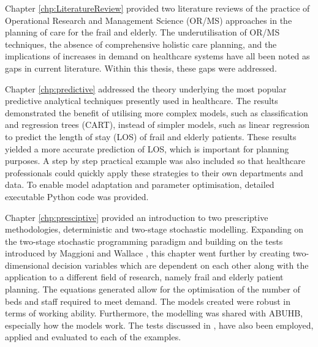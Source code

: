 \documentclass[../thesis.tex]{subfiles}
\begin{document}
Chapter \ref{chp:LiteratureReview} provided two literature reviews of the practice of Operational Research and Management Science (OR/MS) approaches in the planning of care for the frail and elderly. The underutilisation of OR/MS techniques, the absence of comprehensive holistic care planning, and the implications of increases in demand on healthcare systems have all been noted as gaps in current literature. Within this thesis, these gaps were addressed.

Chapter \ref{chp:predictive} addressed the theory underlying the most popular predictive analytical techniques presently used in healthcare. The results demonstrated the benefit of utilising more complex models, such as classification and regression trees (CART), instead of simpler models, such as linear regression to predict the length of stay (LOS) of frail and elderly patients. These results yielded a more accurate prediction of LOS, which is important for planning purposes. A step by step practical example was also included so that healthcare professionals could quickly apply these strategies to their own departments and data. To enable model adaptation and parameter optimisation, detailed executable Python code was provided.

Chapter \ref{chp:presciptive} provided an introduction to two prescriptive methodologies, deterministic and two-stage stochastic modelling. Expanding on the two-stage stochastic programming paradigm and building on the tests introduced by Maggioni and Wallace \cite{Maggioni2010}, this chapter went further by creating two-dimensional decision variables which are dependent on each other along with the application to a different field of research, namely frail and elderly patient planning. The equations generated allow for the optimisation of the number of beds and staff required to meet demand. The models created were robust in terms of working ability. Furthermore, the modelling was shared with ABUHB, especially how the models work. The tests discussed in \cite{Maggioni2010}, have also been employed, applied and evaluated to each of the examples. 
\end{document}
